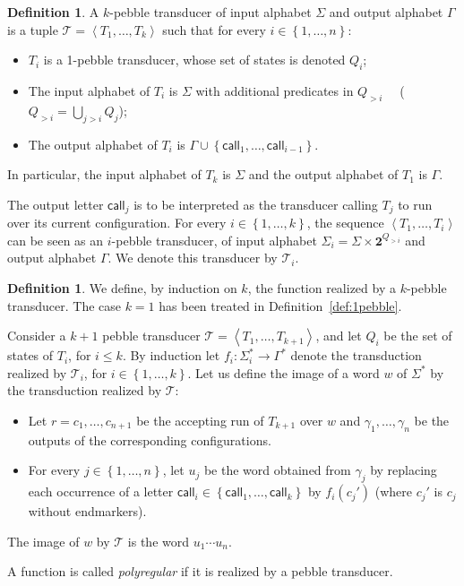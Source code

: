 \documentclass[sigplan,review,anonymous]{acmart}\settopmatter{printfolios=true,printccs=false,printacmref=false}
\newcommand{\set}[1]{\left\{#1 \right\}}
\newcommand{\atuple}[1]{\left\langle #1 \right\rangle}
\newcommand{\Tt}{\mathcal T}
\newcommand{\call}{\mathsf {call}}
\theoremstyle{definition}
\newtheorem{definition}[theorem]{Definition}
\theoremstyle{remark}
\begin{document}
\begin{definition}
  A $k$-pebble transducer of input alphabet $\Sigma$ and output alphabet $\Gamma$ is a tuple $\Tt=\atuple{T_1,\dots,T_{k}}$ such that for every $i\in\set{1,\ldots,n}$:
  \begin{itemize}
  \item  $T_i$ is a 1-pebble transducer, whose set of states is denoted $Q_i$;
  \item  The input alphabet of $T_i$ is $\Sigma$ with additional predicates in $Q_{>i}\quad$ ($Q_{>i}=\bigcup_{j>i}Q_j$);
  \item  The output alphabet of $T_i$ is $\Gamma \cup \set{\call_1,\ldots,\call_{i-1}}$.
  \end{itemize} 
  In particular, the input alphabet of $T_k$ is $\Sigma$ and the output alphabet of $T_1$ is $\Gamma$.
\end{definition}
The output letter $\call_j$ is to be interpreted as the transducer calling $T_j$ to run over its current configuration.
For every $i\in\set{1,\ldots, k}$,  the sequence $\atuple{T_1,\ldots,T_i}$ can be seen as an $i$-pebble transducer, of input alphabet $\Sigma_i=\Sigma\times \mathbf 2 ^{Q_{>i}}$ and output alphabet $\Gamma$. We denote this transducer by $\Tt_i$.

 \begin{definition}
We define, by induction on $k$, the function realized by a $k$-pebble transducer. The case $k=1$ has been treated in Definition~\ref{def:1pebble}. 

Consider a $k+1$ pebble transducer $\Tt=\atuple{T_1,\ldots,T_{k+1}}$, and let $Q_i$ be the set of states of $T_i$, for $i\leq k$.
By induction let $f_i:\Sigma_i^*\to \Gamma^*$ denote the transduction realized by $\Tt_i$, for $i\in \set{1,\ldots,k}$.
Let us define the image of a word $w$ of $\Sigma^*$ by the transduction realized by $\Tt$:
\begin{itemize}
  \item Let $r=c_1,\ldots,c_{n+1}$ be the accepting run of $T_{k+1}$ over $w$ and $\gamma_1,\ldots,\gamma_n$ be the outputs of the corresponding configurations.
  
  \item  For every $j\in\set{1,\ldots,n}$, let $u_j$ be the word obtained from $\gamma_j$ by replacing each occurrence of a letter $\call_i\in \set{\call_1,\ldots,\call_k}$ by $f_i(c_j')$ (where $c_j'$ is $c_j$ without endmarkers).
  
  \end{itemize}
  The image of $w$ by $\Tt$ is the word $u_1\cdots u_n$.

  A function is called \emph{polyregular} if it is realized by a pebble transducer.
\end{definition}
\end{document}
